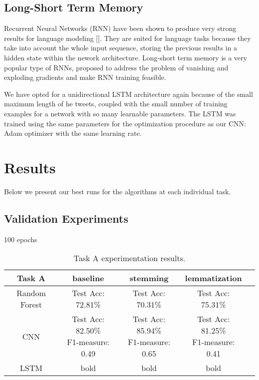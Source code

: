 \documentclass[11pt,a4paper]{article}
\begin{document}
\subsection{Long-Short Term Memory}

Recurrent Neural Networks (RNN) have been shown to produce very strong results for language modeling []. 
They are suited for language tasks because they take into account the whole input sequence, storing the previous results in a hidden state within the nework architecture. Long-short term memory \cite{lstm} is a very popular type of RNNs, proposed to address the problem of vanishing and exploding gradients and make RNN training feasible.

We have opted for a unidirectional LSTM architecture again because of the small maximum length of he tweets, coupled with the small number of training examples for a network with so many learnable parameters. The LSTM was trained using the same parameters for the optimization procedure as our CNN: Adam optimizer with the same learning rate.

\section{Results}

Below we present our best runs for the algorithms at each individual task.

\subsection{Validation Experiments}

100 epochs

\begin{table*}[t]
\begin{center}
\begin{tabular}{|c|cccc|}
\hline \bf Task A & \bf baseline & \bf stemming & \bf lemmatization & \\ \hline
Random Forest & Test Acc: 72.81\% & Test Acc: 70.31\% & Test Acc: 75.31\% & \\ \hline
CNN & \shortstack{Test Acc: 82.50\% \\ F1-measure: 0.49}  & \shortstack{Test Acc: 85.94\% \\ F1-measure: 0.65} & \shortstack{Test Acc: 81.25\% \\ F1-measure: 0.41} & \\ \hline
LSTM & bold & bold & bold & \\
\hline
\end{tabular}
\end{center}
\caption{\label{font-table} Task A experimentation results. }
\end{table*}
\end{document}
